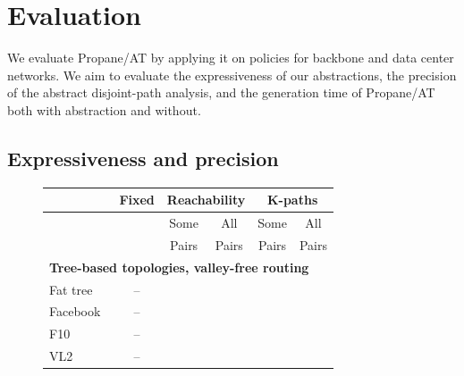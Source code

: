 \documentclass[numbers, 10pt, preprint]{sigplanconf}
\newcommand{\cmark}{\ding{51}}
\newcommand{\sysname}{{\text{}\small \sf Propane/AT}\xspace}
\begin{document}
\section{Evaluation}
\label{sec:evaluation}

We evaluate \sysname by applying it on policies for backbone and data center networks. We aim to evaluate the expressiveness of our abstractions, the precision of the abstract disjoint-path analysis, and the generation time of \sysname both with abstraction and without.

\subsection{Expressiveness and precision}

\begin{figure}[t!]
  \begin{center}
      \begin{tabular}{| l | c| c | c | c | c | }
      \hline
       & \textbf{Fixed} & \multicolumn{2}{|c|}{\textbf{Reachability}} & \multicolumn{2}{|c|}{\textbf{K-paths}} \\ \hline
       & & Some & All & Some & All \\
       & & Pairs & Pairs & Pairs & Pairs \\ \hline

      \multicolumn{6}{l}{\textbf{Tree-based topologies, valley-free routing}} \\ \hline

      Fat tree~\cite{fattree} & -- & \cmark & \cmark & \cmark & \cmark  \\ \hline
      Facebook~\cite{facebook-fattree} & -- & \cmark & \cmark & \cmark & \cmark \\ \hline
      F10~\cite{f10-fattree} & -- & \cmark & \cmark & \cmark & \cmark \\ \hline
      VL2~\cite{vl2-fattree} & -- & \cmark & \cmark & \cmark & \cmark \\ \hline
%


\end{tabular}
\end{center}
\end{figure}
\end{document}
